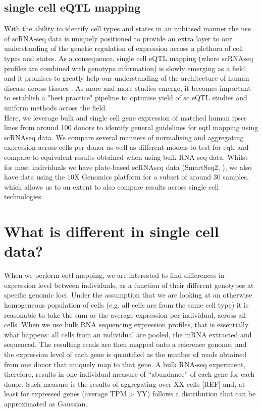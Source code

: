 \subsection{single cell eQTL mapping}

With the ability to identify cell types and states in an unbiased manner the use of scRNA-seq data is uniquely positioned to provide an extra layer to our understanding of the genetic regulation of expression across a plethora of cell types and states.
As a consequence, single cell eQTL mapping (where scRNAseq profiles are combined with genotype information) is slowly emerging as a field and it promises to greatly help our understanding of the architecture of human disease across tissues \cite{wills2013single, van2018single, kang2018multiplexed, sarkar2019discovery, cuomo2020single, jerber2020population, van2020single}.
As more and more studies emerge, it becomes important to establish a "best practice" pipeline to optimise yield of sc eQTL studies and uniform methods across the field.\\

Here, we leverage bulk and single cell gene expression of matched human \gls{ipsc}s lines from around 100 donors to identify general guidelines for \gls{eqtl} mapping using scRNAseq data.
We compare several manners of normalising and aggregating expression across cells per donor as well as different models to test for \gls{eqtl} and compare to equivalent results obtained when using bulk RNA seq data.
Whilst for most individuals we have plate-based scRNAseq data (SmartSeq2, \cite{picelli2013smart}), we also have data using the 10X Genomics platform \cite{} for a subset of around 30 samples, which allows us to an extent to also compare results across single cell technologies.\\

\section{What is different in single cell data?}

When we perform \gls{eqtl} mapping, we are interested to find differences in expression level between individuals, as a function of their different genotypes at specific genomic loci. 
Under the assumption that we are looking at an otherwise homogeneous population of cells (e.g. all cells are from the same cell type) it is reasonable to take the sum or the average expression per individual, across all cells.
When we use bulk RNA sequencing expression profiles, that is essentially what happens: all cells from an individual are pooled, the mRNA extracted and sequenced. 
The resulting reads are then mapped onto a reference genome, and the expression level of each gene is quantified as the number of reads obtained from one donor that uniquely map to that gene. 
A bulk RNA-seq experiment, therefore, results in one individual measure of “abundance” of each gene for each donor. 
Such measure is the results of aggregating over XX cells [REF] and, at least for expressed genes (average TPM > YY) follows a distribution that can be approximated as Gaussian.\\

